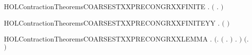\begin{SaveVerbatim}{HOLContractionTheoremsCOARSESTXXPRECONGRXXFINITE}
\HOLTokenTurnstile{} \HOLSymConst{\HOLTokenForall{}} .
         \HOLSymConst{\HOLTokenConj{}}   \HOLSymConst{\HOLTokenImp{}}
       \ensuremath{(}   \HOLSymConst{\HOLTokenEquiv{}} \HOLSymConst{\HOLTokenForall{}}.  \HOLSymConst{\ensuremath{+}}    \HOLSymConst{\ensuremath{+}} \ensuremath{)}
\end{SaveVerbatim}
\newcommand{\HOLContractionTheoremsCOARSESTXXPRECONGRXXFINITE}{\UseVerbatim{HOLContractionTheoremsCOARSESTXXPRECONGRXXFINITE}}
\begin{SaveVerbatim}{HOLContractionTheoremsCOARSESTXXPRECONGRXXFINITEYY}
\HOLTokenTurnstile{} \HOLSymConst{\HOLTokenForall{}} .
         \HOLSymConst{\HOLTokenConj{}}   \HOLSymConst{\HOLTokenImp{}}
       \ensuremath{(}   \HOLSymConst{\HOLTokenEquiv{}}   \ensuremath{)}
\end{SaveVerbatim}
\newcommand{\HOLContractionTheoremsCOARSESTXXPRECONGRXXFINITEYY}{\UseVerbatim{HOLContractionTheoremsCOARSESTXXPRECONGRXXFINITEYY}}
\begin{SaveVerbatim}{HOLContractionTheoremsCOARSESTXXPRECONGRXXLEMMA}
\HOLTokenTurnstile{} \HOLSymConst{\HOLTokenForall{}} .
       \ensuremath{(}\HOLSymConst{\HOLTokenExists{}}.
              \HOLSymConst{\HOLTokenConj{}} \ensuremath{(}\HOLSymConst{\HOLTokenForall{}} .  \HOLTokenWeakTransBegin{}\HOLTokenWeakTransEnd {} \HOLSymConst{\HOLTokenImp{}} \HOLSymConst{\HOLTokenNeg{}}  \ensuremath{)} \HOLSymConst{\HOLTokenConj{}}
            \HOLSymConst{\HOLTokenForall{}} .  \HOLTokenWeakTransBegin{}\HOLTokenWeakTransEnd {} \HOLSymConst{\HOLTokenImp{}} \HOLSymConst{\HOLTokenNeg{}}  \ensuremath{)} \HOLSymConst{\HOLTokenImp{}}
       \ensuremath{(}\HOLSymConst{\HOLTokenForall{}}.  \HOLSymConst{\ensuremath{+}}    \HOLSymConst{\ensuremath{+}} \ensuremath{)} \HOLSymConst{\HOLTokenImp{}}
         
\end{SaveVerbatim}

